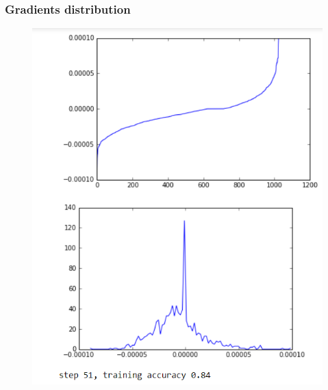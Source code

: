 \begin{frame}
    \frametitle{Gradients distribution}
    \begin{figure}
		\includegraphics[scale=0.28]{figure/50-2.PNG}
    \end{figure}
\end{frame}

